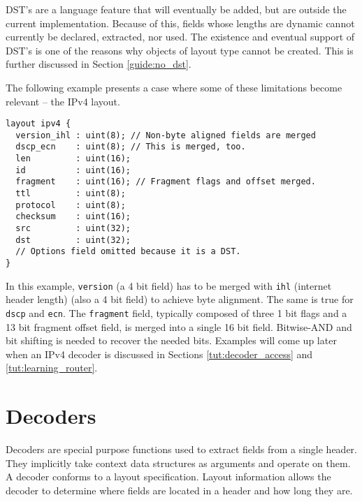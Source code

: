 DST's are a language feature that will eventually be added, but are outside the
current implementation. Because of this, fields whose lengths are dynamic cannot
currently be declared, extracted, nor used. The existence and eventual support
of DST's is one of the reasons why objects of layout type cannot be created.
This is further discussed in Section \ref{guide:no_dst}.

The following example presents a case where some of these limitations become relevant -- the IPv4 layout.

\begin{codepage}
\begin{lstlisting}
layout ipv4 {
  version_ihl : uint(8); // Non-byte aligned fields are merged
  dscp_ecn    : uint(8); // This is merged, too.
  len         : uint(16);
  id          : uint(16);
  fragment    : uint(16); // Fragment flags and offset merged.
  ttl         : uint(8);
  protocol    : uint(8);
  checksum    : uint(16);
  src         : uint(32);
  dst         : uint(32);
  // Options field omitted because it is a DST.
}
\end{lstlisting}
\end{codepage}

In this example, \texttt{version} (a 4 bit field) has to be
merged with \texttt{ihl} (internet header length) (also a 4 bit field) to
achieve byte alignment. The same is true for \texttt{dscp} and \texttt{ecn}. The
\texttt{fragment} field, typically composed of three 1 bit flags and a 13 bit
fragment offset field, is merged into a single 16 bit field. 
Bitwise-AND and bit shifting is needed to recover the needed bits.
Examples will come up later when an IPv4 decoder is discussed in
Sections \ref{tut:decoder_access} and \ref{tut:learning_router}.

\section{Decoders} \label{tut:decoder}

Decoders are special purpose functions
used to extract fields from a single header. 
They implicitly take context data structures as arguments and 
operate on them.
A decoder conforms to a layout specification.
Layout information allows the decoder to determine where fields
are located in a header and how long they are.


%
%
%
%

